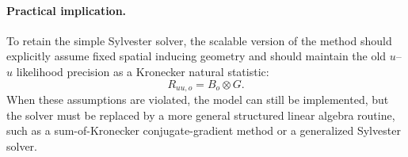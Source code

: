 \documentclass[12pt]{article}
\begin{document}
\paragraph{Practical implication.}
To retain the simple Sylvester solver, the scalable version of the method
should explicitly assume fixed spatial inducing geometry and should
maintain the old $u$--$u$ likelihood precision as a Kronecker natural statistic:
\begin{equation}
    R_{uu,o}=B_o\otimes G.
\end{equation}
When these assumptions are violated, the model can still be implemented,
but the solver must be replaced by a more general structured linear
algebra routine, such as a sum-of-Kronecker conjugate-gradient method or a
generalized Sylvester solver.
\end{document}
